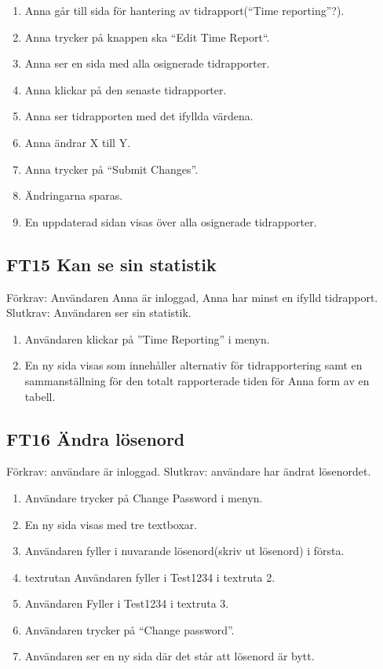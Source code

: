 \documentclass[paper=a4, fontsize=11pt,twoside]{article}
\begin{document}
		\begin{enumerate}
		 \item Anna går till sida för hantering av tidrapport(“Time reporting”?).
			\item Anna trycker på knappen ska “Edit Time Report“.
			\item Anna ser en sida med alla osignerade tidrapporter.
			\item Anna klickar på den senaste tidrapporter.
			\item Anna ser tidrapporten med det ifyllda värdena.
			\item Anna ändrar X till Y.
			\item Anna trycker på “Submit Changes”.
			\item Ändringarna sparas.
			\item En uppdaterad sidan visas över alla osignerade tidrapporter.
		  
		\end{enumerate}
		
		\subsection*{FT15 Kan se sin statistik}
		Förkrav: Användaren Anna är inloggad, Anna har minst en ifylld tidrapport.
		\newline
		Slutkrav: Användaren ser sin statistik.
		
		\begin{enumerate}
		  \item Användaren klickar på ”Time Reporting” i menyn. 
		  \item En ny sida visas som innehåller alternativ för tidrapportering samt en
		  sammanställning för den totalt rapporterade tiden för Anna form av en
		  tabell.
		  
		\end{enumerate}
		
		\subsection*{FT16 Ändra lösenord}
		
		Förkrav: användare är inloggad.
		\newline 
		Slutkrav: användare har ändrat lösenordet.
		
		\begin{enumerate}
		  	\item Användare trycker på Change Password i menyn.
			\item En ny sida visas med tre textboxar.
			\item Användaren fyller i nuvarande lösenord(skriv ut lösenord) i första.
			\item textrutan Användaren fyller i Test1234 i textruta 2.
			\item Användaren Fyller i Test1234 i textruta 3. 
			\item Användaren trycker på “Change password”.
			\item Användaren ser en ny sida där det står att lösenord är bytt.
		  
		\end{enumerate}
		
\end{document}
